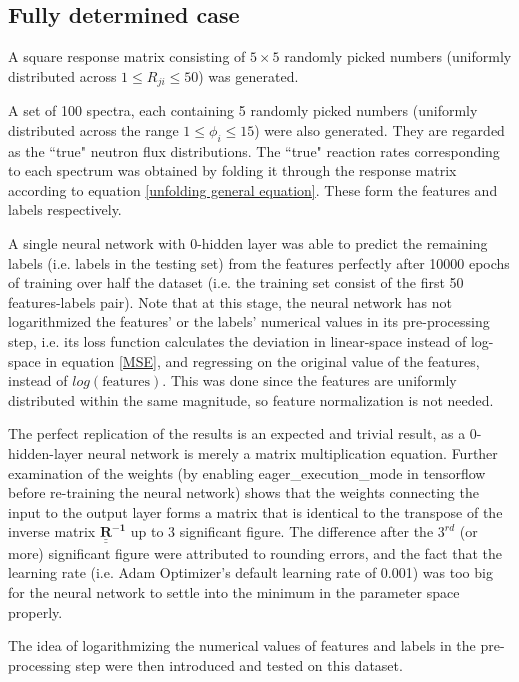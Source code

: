 \documentclass[a4paper, 12pt]{article}
\begin{document}
\subsection{Fully determined case}
A square response matrix consisting of $5\times5$ randomly picked numbers (uniformly distributed across $1\le R_{ji}\le50$) was generated.

A set of 100 spectra, each containing 5 randomly picked numbers (uniformly distributed across the range $1\le\phi_i\le15$) were also generated. They are regarded as the ``true" neutron flux distributions. The ``true" reaction rates corresponding to each spectrum was obtained by folding it through the response matrix according to equation \ref{unfolding general equation}. These form the features and labels respectively.

A single neural network with 0-hidden layer was able to predict the remaining labels (i.e. labels in the testing set) from the features perfectly after 10000 epochs of training over half the dataset (i.e. the training set consist of the first 50 features-labels pair). Note that at this stage, the neural network has not logarithmized the features' or the labels' numerical values in its pre-processing step, i.e. its loss function calculates the deviation in linear-space instead of log-space in equation \ref{MSE}, and regressing on the original value of the features, instead of $log(\text{features})$. This was done since the features are uniformly distributed within the same magnitude, so feature normalization is not needed.

The perfect replication of the results is an expected and trivial result, as a 0-hidden-layer neural network is merely a matrix multiplication equation. Further examination of the weights (by enabling eager\_execution\_mode in tensorflow before re-training the neural network) shows that the weights connecting the input to the output layer forms a matrix that is identical to the transpose of the inverse matrix $\mathbf{\underline{\underline{R}}^{-1}}$ up to 3 significant figure. The difference after the $3^{rd}$ (or more) significant figure were attributed to rounding errors, and the fact that the learning rate (i.e. Adam Optimizer's default learning rate of 0.001) was too big for the neural network to settle into the minimum in the parameter space properly.

The idea of logarithmizing the numerical values of features and labels in the pre-processing step were then introduced and tested on this dataset.
\end{document}
